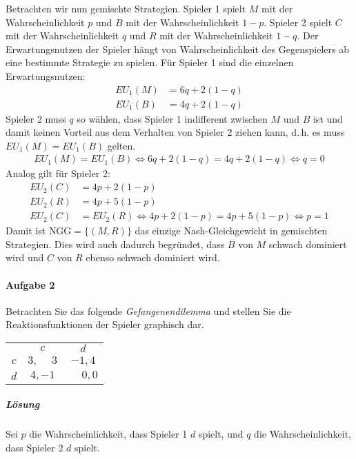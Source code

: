 Betrachten wir nun gemischte Strategien.
Spieler 1 spielt $M$ mit der Wahrscheinlichkeit $p$
und $B$ mit der Wahrscheinlichkeit $1-p$.
Spieler 2 spielt $C$ mit der Wahrscheinlichkeit $q$
und $R$ mit der Wahrscheinlichkeit $1-q$.
Der Erwartungsnutzen der Spieler hängt von Wahrscheinlichkeit des Gegenspielers ab eine
bestimmte Strategie zu spielen.
Für Spieler 1 sind die einzelnen Erwartungsnutzen:
\begin{align*}
  EU_1(M) & = 6q + 2(1-q)\\
  EU_1(B) & = 4q + 2(1-q)
\end{align*}
Spieler 2 muss $q$ so wählen, dass Spieler 1 indifferent zwischen $M$ und $B$ ist und
damit keinen Vorteil aus dem Verhalten von Spieler 2 ziehen kann,
d.\,h. es muss $EU_1(M) = EU_1(B)$ gelten.
\begin{align*}
  EU_1(M) = EU_1(B) \iff 6q + 2(1-q) = 4q + 2(1-q)  \iff q = 0
\end{align*}
Analog gilt für Spieler 2:
\begin{align*}
  EU_2(C) & = 4p + 2(1-p)\\
  EU_2(R) & = 4p + 5(1-p)\\
  EU_2(C) & = EU_2(R) \iff 4p + 2(1-p) = 4p + 5(1-p) \iff p = 1
\end{align*}
Damit ist $\text{NGG} = \{(M,R)\}$ das einzige Nash-Gleichgewicht in gemischten
Strategien.
Dies wird auch dadurch begründet, dass $B$ von $M$ schwach dominiert wird und $C$ von $R$
ebenso schwach dominiert wird.

\paragraph{Aufgabe 2}%
\label{par:serie_5_aufgabe_2}

Betrachten Sie das folgende \emph{Gefangenendilemma} und stellen Sie die
Reaktionsfunktionen der Spieler graphisch dar.
\begin{center}
  \begin{tabular}{ccc}
    & $c$ & $d$\\
    \cmidrule{2-3}
    $c$ & $3,\phantom{-}3$ & $-1,4$\\
    \cmidrule{2-3}
    $d$ & $4,-1$ & $\phantom{-}0,0$\\
    \cmidrule{2-3}
  \end{tabular}
\end{center}

\subparagraph{Lösung}%

Sei $p$ die Wahrscheinlichkeit, dass Spieler 1 $d$ spielt,
und $q$ die Wahrscheinlichkeit, dass Spieler 2 $d$ spielt.

